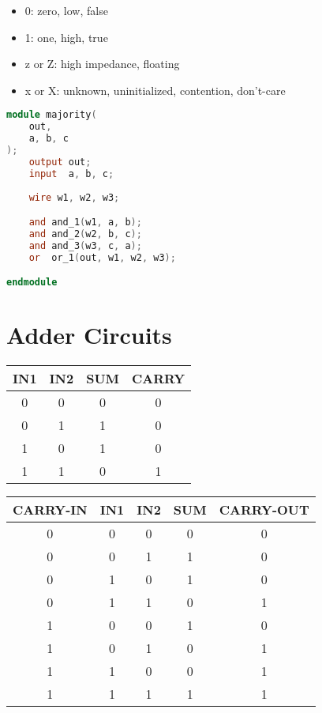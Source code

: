   \begin{itemize}
    \item 0: zero, low, false
    \item 1: one, high, true
    \item z or Z: high impedance, floating
    \item x or X: unknown, uninitialized, contention, don't-care
  \end{itemize}


\begin{lstlisting}[language=Verilog]
module majority(
    out,
    a, b, c
);
    output out;
    input  a, b, c;
    
    wire w1, w2, w3;

    and and_1(w1, a, b);
    and and_2(w2, b, c);
    and and_3(w3, c, a);
    or  or_1(out, w1, w2, w3);

endmodule
\end{lstlisting}

\chapter{Adder Circuits}

    \begin{tabular}{|c|c|c|c|}
      \hline 
      IN1 & IN2 & SUM & CARRY \\ 
      \hline 
      0 & 0 & 0 & 0 \\ 
      \hline 
      0 & 1 & 1 & 0 \\ 
      \hline 
      1 & 0 & 1 & 0 \\ 
      \hline 
      1 & 1 & 0 & 1 \\ 
      \hline 
    \end{tabular} 


  \begin{tabular}{|c|c|c|c|c|}
      \hline 
      CARRY-IN & IN1 & IN2 & SUM & CARRY-OUT \\ 
      \hline 
      0 & 0 & 0 & 0 & 0 \\ 
      \hline 
      0 & 0 & 1 & 1 & 0 \\ 
      \hline 
      0 & 1 & 0 & 1 & 0 \\ 
      \hline 
      0 & 1 & 1 & 0 & 1 \\ 
      \hline 
      1 & 0 & 0 & 1 & 0 \\ 
      \hline 
      1 & 0 & 1 & 0 & 1 \\ 
      \hline 
      1 & 1 & 0 & 0 & 1 \\ 
      \hline 
      1 & 1 & 1 & 1 & 1 \\ 
      \hline 
  \end{tabular} 


